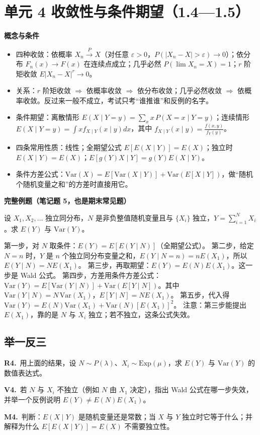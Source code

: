 \documentclass[UTF8,a4paper,11pt]{ctexart}
\newcommand{\CompactQuestion}[2]{\par\noindent\textbf{#1.}\ #2\par\vspace{.8em}}
\begin{document}
\section{单元 4 收敛性与条件期望（1.4—1.5）}
\textbf{概念与条件}

\begin{itemize}
\item 四种收敛：依概率 $X_n\xrightarrow{P}X$（对任意 $\varepsilon>0$，$P(|X_n-X|>\varepsilon)\to0$）；依分布 $F_n(x)\to F(x)$ 在连续点成立；几乎必然 $P(\lim X_n=X)=1$；$r$ 阶矩收敛 $E|X_n-X|^r\to0$。
\item 关系：$r$ 阶矩收敛 $\Rightarrow$ 依概率收敛 $\Rightarrow$ 依分布收敛；几乎必然收敛 $\Rightarrow$ 依概率收敛。反过来一般不成立，考试只考“谁推谁”和反例的名字。
\item 条件期望：离散情形 $E(X\mid Y=y)=\sum_x x\,P(X=x\mid Y=y)$；连续情形 $E(X\mid Y=y)=\int x f_{X\mid Y}(x\mid y)dx$，其中 $f_{X\mid Y}(x\mid y)=\frac{f(x,y)}{f_Y(y)}$。
\item 四条常用性质：线性；全期望公式 $E[E(X\mid Y)]=E(X)$；独立时 $E(X\mid Y)=E(X)$；$E[g(Y)X\mid Y]=g(Y)E(X\mid Y)$。
\item 条件方差公式：$\mathrm{Var}(X)=E[\mathrm{Var}(X\mid Y)]+\mathrm{Var}(E[X\mid Y])$，做“随机个随机变量之和”的方差时直接用它。
\end{itemize}
\textbf{完整例题（笔记题 5，也是期末常见题）}

设 $X_1,X_2,\dots$ 独立同分布，$N$ 是非负整值随机变量且与 $\{X_i\}$ 独立，$Y=\sum_{i=1}^{N}X_i$。求 $E(Y)$ 与 $\mathrm{Var}(Y)$。

第一步，对 $N$ 取条件：$E(Y)=E[E(Y\mid N)]$（全期望公式）。 第二步，给定 $N=n$ 时，$Y$ 是 $n$ 个独立同分布变量之和，$E(Y\mid N=n)=nE(X_1)$，所以 $E(Y\mid N)=NE(X_1)$。 第三步，再取期望：$E(Y)=E(N)E(X_1)$。这一步是 Wald 公式。 第四步，方差用条件方差公式：$\mathrm{Var}(Y)=E[\mathrm{Var}(Y\mid N)]+\mathrm{Var}(E[Y\mid N])$。其中 $\mathrm{Var}(Y\mid N)=N\,\mathrm{Var}(X_1)$，$E[Y\mid N]=N E(X_1)$。 第五步，代入得 $\mathrm{Var}(Y)=E(N)\mathrm{Var}(X_1)+\mathrm{Var}(N)[E(X_1)]^2$。 注意：第三步能提出 $E(X_1)$，靠的是 $N$ 与 $X_i$ 独立；若不独立，这条公式失效。

\subsection{举一反三}
\CompactQuestion{R4}{用上面的结果，设 $N\sim P(\lambda)$、$X_i\sim \mathrm{Exp}(\mu)$，求 $E(Y)$ 与 $\mathrm{Var}(Y)$ 的数值表达式。}
\CompactQuestion{V4}{若 $N$ 与 $X_i$ 不独立（例如 $N$ 由 $X_1$ 决定），指出 Wald 公式在哪一步失效，并举一个反例说明 $E(Y)\ne E(N)E(X_1)$。}
\CompactQuestion{M4}{判断：$E(X\mid Y)$ 是随机变量还是常数；当 $X$ 与 $Y$ 独立时它等于什么；并解释为什么 $E[E(X\mid Y)]=E(X)$ 不需要独立性。}
\clearpage
{}
\end{document}
